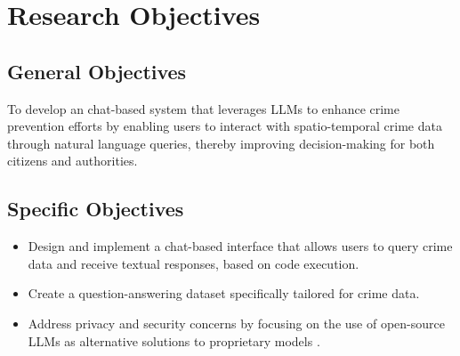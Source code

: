 \section{Research Objectives} %

\subsection{General Objectives}
To develop an chat-based system that leverages LLMs to enhance crime prevention efforts by enabling users to interact with spatio-temporal crime data through natural language queries, thereby improving decision-making for both citizens and authorities.

\subsection{Specific Objectives}
\begin{itemize}
    \item Design and implement a chat-based interface that allows users to query crime data and receive textual responses, based on code execution.
    \item Create a question-answering dataset specifically tailored for crime data.
    \item Address privacy and security concerns by focusing on the use of open-source LLMs as alternative solutions to proprietary models \citep{Temsah2025DeepSeek, Ersoz2025CrimePredictionXAISurvey}. 
\end{itemize}

